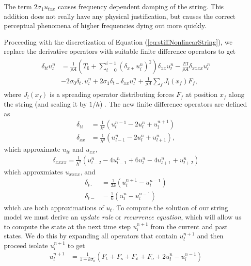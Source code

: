 \documentclass{article}
\begin{document}
The term $2 \sigma_1 u_{txx}$ causes frequency dependent damping of the string.
This addition does not really have any physical justification, but causes the correct perceptual phenomena of higher frequencies dying out more quickly\cite{bensa_simulation_2003}.

Proceeding with the discretization of Equation (\ref{eq:stiffNonlinearString}), we replace the derivative operators with suitable finite difference operators to get
\begin{align}
  \begin{split}
    \delta_{tt} u^n_l &= \frac{1}{\rho A} \left(T_0 + \sum^{i-1}_{i=0} (\delta_{x+} u^n_i)^2 \right)\delta_{xx}u^n_l - \frac{E I}{\rho A} \delta_{xxxx} u^n_l\\
    &- 2 \sigma_0 \delta_{t\cdot} u^n_l + 2 \sigma_1 \delta_{t-} \delta_{xx}u^n_l + \frac{1}{\rho A} \sum_fJ_l(x_f)F_f,
  \end{split}
\end{align}
where $J_l(x_f)$ is a spreading operator distributing forces $F_f$ at position $x_f$ along the string (and scaling it by $1/h$) \cite[Chapter 5]{bilbao_numerical_2009}.
The new finite difference operators are defined as
\begin{align}
  \delta_{tt} &= \frac{1}{k^2}(u^{n-1}_l - 2 u^n_l + u^{n+1}_l) \\
  \delta_{xx} &= \frac{1}{h^2}(u^n_{l-1} - 2 u^n_l + u^n_{l+1}),
\end{align}
which approximate $u_{tt}$ and $u_{xx}$,
\begin{align}
  \delta_{xxxx} = \frac{1}{h^2}(u^n_{l-2} - 4 u^n_{l-1} + 6 u^n_l - 4 u^n_{l+1} + u^n_{l+2})
\end{align}
which approxmiates $u_{xxxx}$, and
\begin{align}
  \delta_{t\cdot} &= \frac{1}{2k} (u^{n+1}_l - u^{n-1}_l) \\
  \delta_{t-} &=\frac{1}{k} (u^{n}_l - u^{n-1}_l)
\end{align}
which are both approximations of $u_t$. To compute the solution of our string model we must derive an \textit{update rule} or \textit{recurrence equation}, which will allow us to compute the state at the next time step $u^{n+1}_l$ from the current and past states.
We do this by expanding all operators that contain $u^{n+1}_l$ and then proceed isolate $u^{n+1}_l$ to get
\begin{align}
  \label{eq:stringUpdate}
  u^{n+1}_l &= \frac{1}{1 + k\sigma_0} (F_\text{t} + F_\text{s} + F_\text{d} + F_\text{e} + 2u^n_l - u^{n-1}_l)
\end{align}
\end{document}
